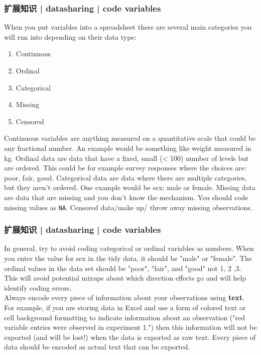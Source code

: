 \begin{frame}[fragile]
  \frametitle{扩展知识 | datasharing | code variables}
  When you put variables into a spreadsheet there are several main categories you will run into depending on their data type:
  \begin{enumerate}
    \item Continuous
    \item Ordinal
    \item Categorical
    \item Missing
    \item Censored
  \end{enumerate}

  Continuous variables are anything measured on a quantitative scale that could be any fractional number. An example would be something like weight measured in kg. Ordinal data are data that have a fixed, small (< 100) number of levels but are ordered. This could be for example survey responses where the choices are: poor, fair, good.  Categorical data are data where there are multiple categories, but they aren't ordered. One example would be sex: male or female. Missing data are data that are missing and you don't know the mechanism. You should code missing values as \verb|NA|.  Censored data/make up/ throw away missing observations.
\end{frame}

\begin{frame}
  \frametitle{扩展知识 | datasharing | code variables}
  In general, try to avoid coding categorical or ordinal variables as numbers. When you enter the value for sex in the tidy data, it should be "male" or "female". The ordinal values in the data set should be "poor", "fair", and "good" not 1, 2 ,3. This will avoid potential mixups about which direction effects go and will help identify coding errors.\\
  \vspace{1em}
  Always encode every piece of information about your observations using \textbf{text}. For example, if you are storing data in Excel and use a form of colored text or cell background formatting to indicate information about an observation ("red variable entries were observed in experiment 1.") then this information will not be exported (and will be lost!) when the data is exported as raw text. Every piece of data should be encoded as actual text that can be exported. 
\end{frame}

